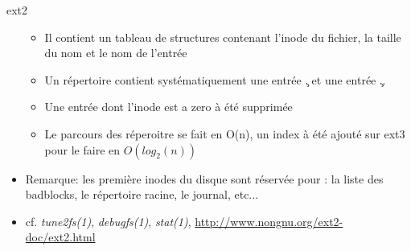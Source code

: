 \begin{frame}[fragile=singleslide]{ext2}
\begin{itemize}
    \begin{itemize}
    \item Il  contient un tableau  de structures contenant  l'inode du
      fichier, la taille du nom et le nom de l'entrée
    \item Un répertoire contient  systématiquement une entrée \c{.} et
      une entrée \c{..}
    \item Une entrée dont l'inode est a zero à été supprimée
    \item Le parcours  des réperoitre se fait en O(n),  un index à été
      ajouté sur ext3 pour le faire en $O(log_2(n))$
    \end{itemize}
  \item Remarque: les  première inodes du disque sont  réservée pour :
    la liste des badblocks, le répertoire racine, le journal, etc...
  \item  cf.   \emph{tune2fs(1)},  \emph{debugfs(1)},  \emph{stat(1)},
    \url{http://www.nongnu.org/ext2-doc/ext2.html}
  \end{itemize}
\end{frame}


